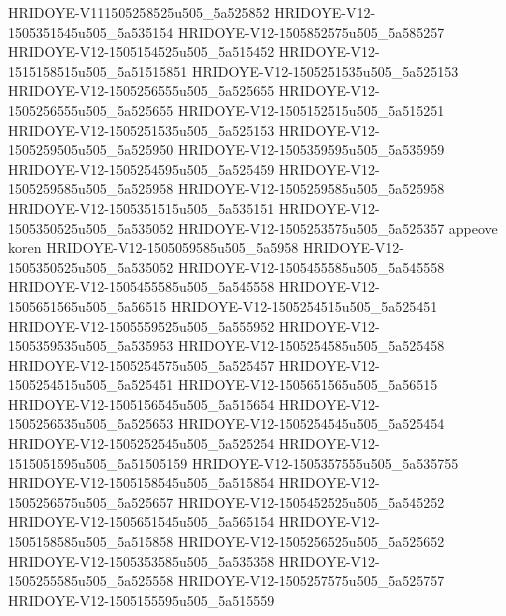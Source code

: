 HRIDOYE-V111505258525u505_5a525852
HRIDOYE-V12-1505351545u505_5a535154
HRIDOYE-V12-1505852575u505_5a585257 
HRIDOYE-V12-1505154525u505_5a515452
HRIDOYE-V12-1515158515u505_5a51515851
HRIDOYE-V12-1505251535u505_5a525153
HRIDOYE-V12-1505256555u505_5a525655
HRIDOYE-V12-1505256555u505_5a525655
HRIDOYE-V12-1505152515u505_5a515251
HRIDOYE-V12-1505251535u505_5a525153
HRIDOYE-V12-1505259505u505_5a525950
HRIDOYE-V12-1505359595u505_5a535959
HRIDOYE-V12-1505254595u505_5a525459
HRIDOYE-V12-1505259585u505_5a525958
HRIDOYE-V12-1505259585u505_5a525958
HRIDOYE-V12-1505351515u505_5a535151
HRIDOYE-V12-1505350525u505_5a535052
HRIDOYE-V12-1505253575u505_5a525357
appeove koren
HRIDOYE-V12-1505059585u505_5a5958
HRIDOYE-V12-1505350525u505_5a535052
HRIDOYE-V12-1505455585u505_5a545558
HRIDOYE-V12-1505455585u505_5a545558
HRIDOYE-V12-1505651565u505_5a56515
HRIDOYE-V12-1505254515u505_5a525451
HRIDOYE-V12-1505559525u505_5a555952
HRIDOYE-V12-1505359535u505_5a535953
HRIDOYE-V12-1505254585u505_5a525458
HRIDOYE-V12-1505254575u505_5a525457
HRIDOYE-V12-1505254515u505_5a525451
HRIDOYE-V12-1505651565u505_5a56515
HRIDOYE-V12-1505156545u505_5a515654
HRIDOYE-V12-1505256535u505_5a525653
HRIDOYE-V12-1505254545u505_5a525454
HRIDOYE-V12-1505252545u505_5a525254
HRIDOYE-V12-1515051595u505_5a51505159
HRIDOYE-V12-1505357555u505_5a535755
HRIDOYE-V12-1505158545u505_5a515854
HRIDOYE-V12-1505256575u505_5a525657
HRIDOYE-V12-1505452525u505_5a545252
HRIDOYE-V12-1505651545u505_5a565154
HRIDOYE-V12-1505158585u505_5a515858
HRIDOYE-V12-1505256525u505_5a525652
HRIDOYE-V12-1505353585u505_5a535358
HRIDOYE-V12-1505255585u505_5a525558
HRIDOYE-V12-1505257575u505_5a525757
HRIDOYE-V12-1505155595u505_5a515559
